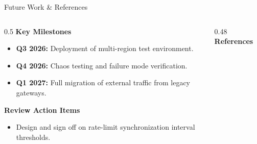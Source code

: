 \begin{frame}{Future Work \& References}
  \begin{columns}[T]
    \begin{column}{0.5\textwidth}
      \textbf{Key Milestones}
      \begin{itemize}
        \item[\faCalendar] \textbf{Q3 2026:} Deployment of multi-region test environment.
        \item[\faCalendar] \textbf{Q4 2026:} Chaos testing and failure mode verification.
        \item[\faCalendar] \textbf{Q1 2027:} Full migration of external traffic from legacy gateways.
      \end{itemize}
      \vspace{0.3cm}
      \textbf{Review Action Items}
      \begin{itemize}
        \item Design and sign off on rate-limit synchronization interval thresholds.
      \end{itemize}
    \end{column}
    
    \begin{column}{0.48\textwidth}
      \textbf{References}
      \nocite{*}
      \printbibliography[heading=none]
    \end{column}
  \end{columns}
\end{frame}
